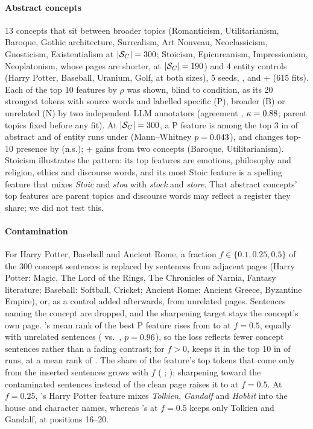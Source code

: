 \paragraph{Abstract concepts}
13 concepts that sit between broader topics (Romanticism, Utilitarianism, Baroque, Gothic architecture, Surrealism, Art Nouveau, Neoclassicism, Gnosticism, Existentialism at $|\mathcal{S}_C| = 300$; Stoicism, Epicureanism, Impressionism, Neoplatonism, whose pages are shorter, at $|\mathcal{S}_C| = 190$) and 4 entity controls (Harry Potter, Baseball, Uranium, Golf, at both sizes), 5 seeds, \ember{}, \cs{} and \cs{}+\gs{} (615 fits).
Each of the top 10 features by $\rho$ was shown, blind to condition, as its 20 strongest tokens with source words and labelled specific (P), broader (B) or unrelated (N) by two independent LLM annotators (agreement , $\kappa = 0.88$; parent topics fixed before any fit).
At $|\mathcal{S}_C| = 300$, a P feature is among the top 3 in  of abstract and  of entity runs under \ember{} (Mann--Whitney $p = 0.043$), and \cs{} changes top-10 presence by  (n.s.); \cs{}+\gs{} gains  from two concepts (Baroque, Utilitarianism).
Stoicism illustrates the pattern: its top features are emotions, philosophy and religion, ethics and discourse words, and its most Stoic feature is a spelling feature that mixes \emph{Stoic} and \emph{stoa} with \emph{stock} and \emph{store}.
That abstract concepts' top features are parent topics and discourse words may reflect a register they share; we did not test this.

\paragraph{Contamination}
For Harry Potter, Baseball and Ancient Rome, a fraction $f \in \{0.1, 0.25, 0.5\}$ of the 300 concept sentences is replaced by sentences from adjacent pages (Harry Potter: Magic, The Lord of the Rings, The Chronicles of Narnia, Fantasy literature; Baseball: Softball, Cricket; Ancient Rome: Ancient Greece, Byzantine Empire), or, as a control added afterwards, from unrelated pages. Sentences naming the concept are dropped, and the sharpening target stays the concept's own page.
\ember{}'s mean rank of the best P feature rises from  to  at $f = 0.5$, equally with unrelated sentences ( vs.\ , $p = 0.96$), so the loss reflects fewer concept sentences rather than a fading contrast; for $f > 0$, \cs{} keeps it in the top 10 in  of runs, at a mean rank of .
The share of the feature's top tokens that come only from the inserted sentences grows with $f$ (\ember{} ; \cs{} ); sharpening toward the contaminated sentences instead of the clean page raises it to  at $f = 0.5$. At $f = 0.25$, \ember{}'s Harry Potter feature mixes \emph{Tolkien}, \emph{Gandalf} and \emph{Hobbit} into the house and character names, whereas \cs{}'s at $f = 0.5$ keeps only Tolkien and Gandalf, at positions 16--20.

